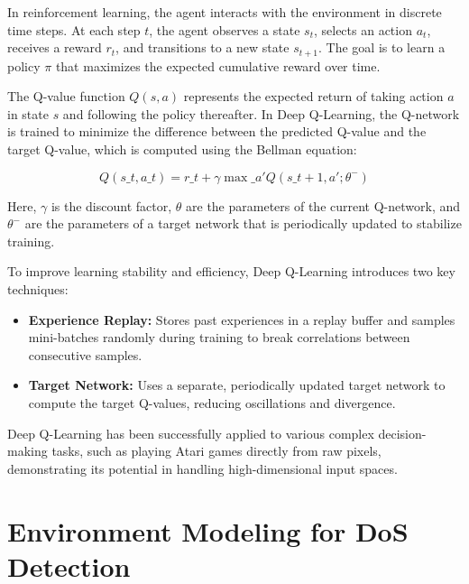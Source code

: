 \documentclass[12pt]{report}
\begin{document}
In reinforcement learning, the agent interacts with the environment in discrete time steps. At each step $t$, the agent observes a state $s_t$, selects an action $a_t$, receives a reward $r_t$, and transitions to a new state $s_{t+1}$. The goal is to learn a policy $\pi$ that maximizes the expected cumulative reward over time.

The Q-value function $Q(s, a)$ represents the expected return of taking action $a$ in state $s$ and following the policy thereafter. In Deep Q-Learning, the Q-network is trained to minimize the difference between the predicted Q-value and the target Q-value, which is computed using the Bellman equation:

\begin{equation}
Q(s\_t, a\_t) = r\_t + \gamma \max\_{a'} Q(s\_{t+1}, a'; \theta^-)
\end{equation}

Here, $\gamma$ is the discount factor, $\theta$ are the parameters of the current Q-network, and $\theta^-$ are the parameters of a target network that is periodically updated to stabilize training.

To improve learning stability and efficiency, Deep Q-Learning introduces two key techniques:
\begin{itemize}
\item \textbf{Experience Replay:} Stores past experiences in a replay buffer and samples mini-batches randomly during training to break correlations between consecutive samples.
\item \textbf{Target Network:} Uses a separate, periodically updated target network to compute the target Q-values, reducing oscillations and divergence.
\end{itemize}

Deep Q-Learning has been successfully applied to various complex decision-making tasks, such as playing Atari games directly from raw pixels, demonstrating its potential in handling high-dimensional input spaces.



\section{Environment Modeling for DoS Detection}
\end{document}
